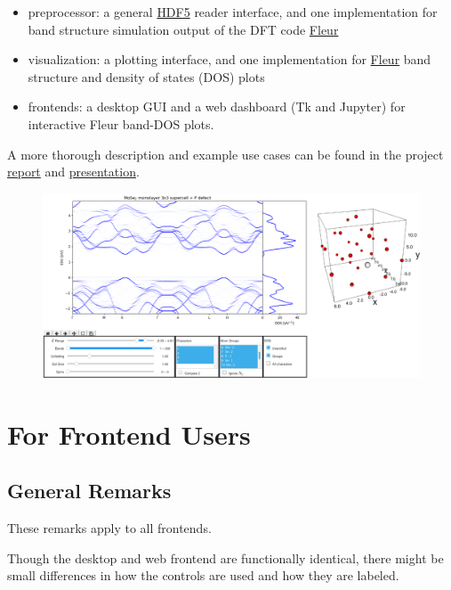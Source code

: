 \begin{itemize}
    \tightlist
\item
    preprocessor: a general
    \href{https://www.hdfgroup.org/solutions/hdf5/}{HDF5} reader interface, and
    one implementation for band structure simulation output of the DFT code \href{http://www.judft.de}{Fleur}
\item visualization: a plotting interface, and one implementation for
    \href{http://www.judft.de}{Fleur} band structure and density of states (DOS)
    plots
\item
    frontends: a desktop GUI and a web dashboard (Tk and Jupyter) for
    interactive Fleur band-DOS plots.
\end{itemize}

A more thorough description and example use cases can be found in the
project \href{./doc/report.pdf}{report} and
\href{./doc/presentation.pdf}{presentation}.

\begin{figure}
    \centering
    \includegraphics{./readme/web_frontend.png}
\end{figure}

\section{For Frontend Users}\label{for-frontend-users}

\subsection{General Remarks}\label{general-remarks}

These remarks apply to all frontends.

Though the desktop and web frontend are functionally identical, there
might be small differences in how the controls are used and how they are
labeled.

